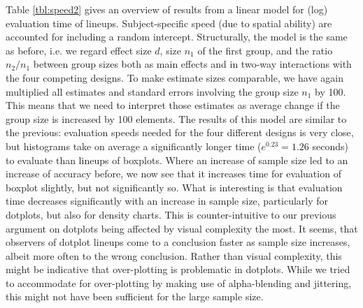 Table \ref{tbl:speed2} gives an overview of results from a linear model for (log) evaluation time of lineups. Subject-specific speed (due to spatial ability) are accounted for  including a random intercept. Structurally, the model is the same as before, i.e. we regard effect size $d$, size $n_1$ of the first group, and the ratio $n_2/n_1$ between group sizes both as main effects and in two-way interactions with the four competing designs. To make estimate sizes comparable, we have again multiplied all estimates and standard errors involving the group size $n_1$ by 100. This means that we need to interpret those  estimates as average change if the group size is increased by 100 elements. 
The results of this model are similar to the previous: evaluation speeds needed for the four different designs is very close, but  histograms take on average a significantly longer time ($e^{0.23} = 1.26$ seconds) to evaluate than lineups of boxplots. 
Where an increase of sample size led to an increase of accuracy before, we now see that it increases time for evaluation of boxplot slightly, but not significantly so. What is interesting is that evaluation time decreases significantly with an increase in sample size, particularly for dotplots, but also for density charts. This is counter-intuitive to our previous argument on dotplots being affected by visual complexity the most. It seems, that observers of dotplot lineups come to a conclusion faster as sample size increases, albeit more often to  the wrong conclusion. Rather than visual complexity, this might be indicative that over-plotting is problematic in dotplots. While we tried to accommodate for over-plotting by making use of alpha-blending and jittering, this might not have been sufficient for the large sample size.
 
